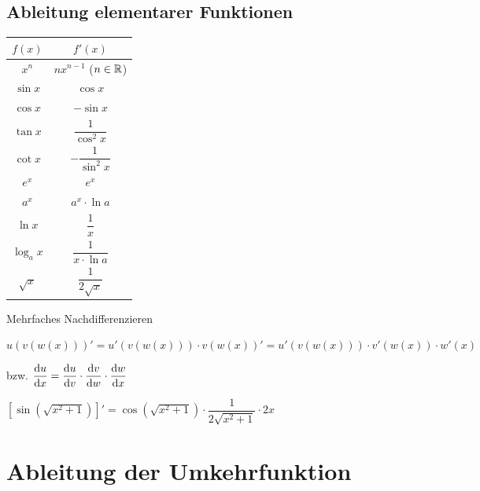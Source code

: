 \subsection{Ableitung elementarer Funktionen}

\begin{tabular}{c|c}
	$f(x)$ & $f'(x)$\\
	\hline
	$x^n$ & $nx^{n-1}$ ($n\in\mathbb{R}$)\\
	$\sin x$ & $\cos x$\\
	$\cos x$ & $-\sin x$\\
	$\tan x$ & $\dfrac{1}{\cos^2 x}$\\
	$\cot x$ & $-\dfrac{1}{\sin^2 x}$\\
	$e^x$ & $e^x$\\
	$a^x$ & $a^x\cdot\ln a$\\
	$\ln x$ & $\dfrac{1}{x}$\\
	$\log_ax$ & $\dfrac{1}{x\cdot\ln a}$\\
	$\sqrt{x}$ & $\dfrac{1}{2\sqrt{x}}$\\
\end{tabular}

\Bem Mehrfaches Nachdifferenzieren

$u(v(w(x)))' = u'(v(w(x)))\cdot v(w(x))' = u'(v(w(x)))\cdot v'(w(x))\cdot w'(x)$

bzw. $\dfrac{\mathrm{d}u}{\mathrm{d}x} = \dfrac{\mathrm{d}u}{\mathrm{d}v}\cdot\dfrac{\mathrm{d}v}{\mathrm{d}w}\cdot\dfrac{\mathrm{d}w}{\mathrm{d}x}$

\Bsp $[\sin(\sqrt{x^2+1})]' = \cos(\sqrt{x^2+1})\cdot\dfrac{1}{2\sqrt{x^2+1}}\cdot 2x$

\section{Ableitung der Umkehrfunktion}

